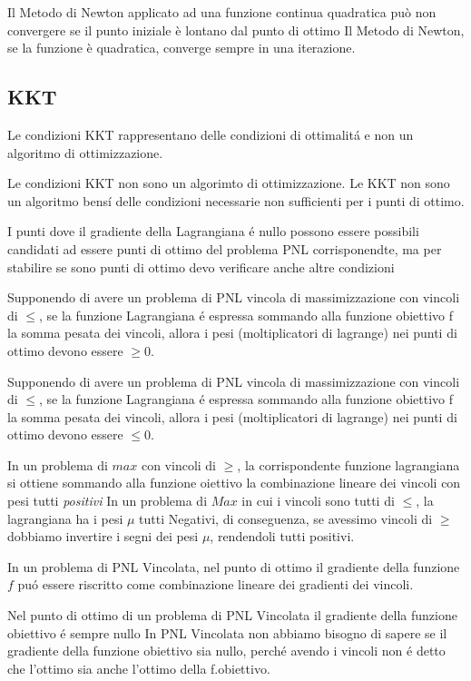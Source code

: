 \documentclass[12pt, a4paper, openany]{book}
\begin{document}
\affermazionefalse
{Il Metodo di Newton applicato ad una funzione continua quadratica può non convergere se il punto iniziale è lontano dal punto di ottimo}
{Il Metodo di Newton, se la funzione è quadratica, converge sempre in una iterazione.}

\subsection{KKT}
\affermazionetrue
{Le condizioni KKT rappresentano delle condizioni di ottimalitá e non un algoritmo di ottimizzazione.}

\affermazionetrue
{Le condizioni KKT non sono un algorimto di ottimizzazione.}
{Le KKT non sono un algoritmo bensí delle condizioni necessarie non sufficienti per i punti di ottimo.}

\affermazionetrue
{I punti dove il gradiente della Lagrangiana é nullo possono essere possibili candidati ad essere punti di ottimo del problema PNL corrisponendte,
ma per stabilire se sono punti di ottimo devo verificare anche altre condizioni}
{}

\affermazionetrue
{Supponendo di avere un problema di PNL vincola di massimizzazione con vincoli di $\leq$, se la funzione Lagrangiana é espressa sommando alla funzione obiettivo f la somma pesata dei vincoli, allora i pesi (moltiplicatori di lagrange) nei punti di ottimo devono essere $\geq 0$.}

\affermazionefalse
{Supponendo di avere un problema di PNL vincola di massimizzazione con vincoli di $\leq$, se la funzione Lagrangiana é espressa sommando alla funzione obiettivo f la somma pesata dei vincoli, allora i pesi (moltiplicatori di lagrange) nei punti di ottimo devono essere $\leq 0$.}

\affermazionetrue
{In un problema di $max$ con vincoli di $\geq$, la corrispondente funzione lagrangiana si ottiene sommando alla funzione oiettivo la combinazione lineare dei vincoli con pesi tutti \emph{positivi}}
{In un problema di $Max$ in cui i vincoli sono tutti di $\leq$, la lagrangiana ha i pesi $\mu$ tutti Negativi, di conseguenza, se avessimo vincoli di $\geq$ dobbiamo invertire i segni dei pesi $\mu$, rendendoli tutti positivi.}

\affermazionetrue
{In un problema di PNL Vincolata, nel punto di ottimo il gradiente della funzione $f$ puó essere riscritto come combinazione lineare dei gradienti dei vincoli.}

\affermazionefalse
{Nel punto di ottimo di un problema di PNL Vincolata il gradiente della funzione obiettivo é sempre nullo}
{In PNL Vincolata non abbiamo bisogno di sapere se il gradiente della funzione obiettivo sia nullo, perché avendo i vincoli non é detto che l'ottimo sia anche l'ottimo della f.obiettivo.}
\end{document}
